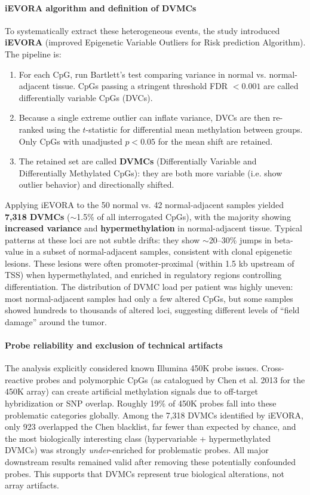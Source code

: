 \documentclass[10pt]{extarticle}
\begin{document}
\paragraph{iEVORA algorithm and definition of DVMCs}
To systematically extract these heterogeneous events, the study introduced \textbf{iEVORA} (improved Epigenetic Variable Outliers for Risk prediction Algorithm). The pipeline is: 
\begin{enumerate}
  \item For each CpG, run Bartlett’s test comparing variance in normal vs. normal-adjacent tissue. CpGs passing a stringent threshold FDR $< 0.001$ are called differentially variable CpGs (DVCs).
  \item Because a single extreme outlier can inflate variance, DVCs are then re-ranked using the $t$-statistic for differential mean methylation between groups. Only CpGs with unadjusted $p < 0.05$ for the mean shift are retained.
  \item The retained set are called \textbf{DVMCs} (Differentially Variable and Differentially Methylated CpGs): they are both more variable (i.e. show outlier behavior) and directionally shifted.
\end{enumerate}
Applying iEVORA to the 50 normal vs. 42 normal-adjacent samples yielded \textbf{7{,}318 DVMCs} ($\sim$1.5\% of all interrogated CpGs), with the majority showing \textbf{increased variance} and \textbf{hypermethylation} in normal-adjacent tissue. Typical patterns at these loci are not subtle drifts: they show $\sim$20--30\% jumps in beta-value in a subset of normal-adjacent samples, consistent with clonal epigenetic lesions. These lesions were often promoter-proximal (within 1.5 kb upstream of TSS) when hypermethylated, and enriched in regulatory regions controlling differentiation. The distribution of DVMC load per patient was highly uneven: most normal-adjacent samples had only a few altered CpGs, but some samples showed hundreds to thousands of altered loci, suggesting different levels of “field damage” around the tumor.

\paragraph{Probe reliability and exclusion of technical artifacts}
The analysis explicitly considered known Illumina 450K probe issues. Cross-reactive probes and polymorphic CpGs (as catalogued by Chen et al. 2013 for the 450K array) can create artificial methylation signals due to off-target hybridization or SNP overlap. Roughly 19\% of 450K probes fall into these problematic categories globally. Among the 7{,}318 DVMCs identified by iEVORA, only 923 overlapped the Chen blacklist, far fewer than expected by chance, and the most biologically interesting class (hypervariable + hypermethylated DVMCs) was strongly \textit{under}-enriched for problematic probes. All major downstream results remained valid after removing these potentially confounded probes. This supports that DVMCs represent true biological alterations, not array artifacts.
\end{document}
